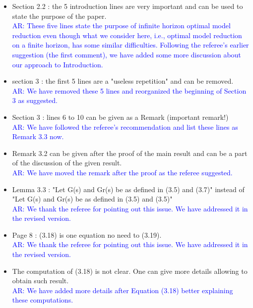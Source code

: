 \documentclass[11pt]{article}
\def\serkan#1{\textcolor{blue}{{#1}}}
\begin{document}
\begin{itemize}
\item  Section 2.2 : the 5 introduction lines are very important and can be
used to state the purpose of the paper. \\ [1ex]
\serkan{\textsf{AR}: These five lines state the purpose of infinite horizon optimal model reduction even though what we consider here, i.e., optimal model reduction on a finite horizon, has some similar difficulties. Following the referee's earlier suggestion (the first comment), we have added some more discussion about our approach to  Introduction.}

\item section 3 : the first 5 lines are a "useless repetition" and can be
removed. \\ [1ex]
\serkan{\textsf{AR}:  We have removed these 5 lines and reorganized the beginning of Section 3 as suggested.}


\item Section 3 : lines 6 to 10 can be given as a Remark (important remark!)  \\ [1ex]
\serkan{\textsf{AR}:  We have followed  the referee's recommendation and list these lines as Remark 3.3 now. }

\item Remark 3.2 can be given after the proof of the main result and can be
a part of the discussion of the given result. \\[1ex]
\serkan{\textsf{AR}:  We have moved the remark after the proof as the referee suggested. }

\item Lemma 3.3 : "Let G(s) and Gr(s) be as defined in (3.5) and (3.7)"
instead of "Let G(s) and Gr(s) be as defined in (3.5) and (3.5)" \\ [1ex]
\serkan{\textsf{AR}:  We thank the referee for pointing out this issue. We have addressed it in the revised version.} 

\item Page 8 : (3.18) is one equation no need to (3.19). \\ [1ex]
\serkan{\textsf{AR}:  We thank the referee for pointing out this issue. We have addressed it in the revised version.}

\item The computation of (3.18) is not clear. One can give more details
allowing to obtain such result. \\ [1ex]
\serkan{\textsf{AR}:   We have added more details after Equation (3.18) better explaining these computations.}


\end{itemize}
\end{document}
